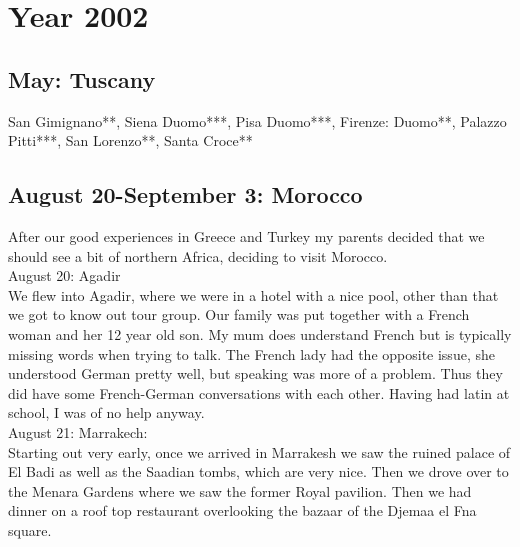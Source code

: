 \chapter{Year 2002}
\label{2002}

\section{May: Tuscany}
\label{2002:Tuscany}


San Gimignano**, Siena Duomo***, Pisa Duomo***, Firenze: Duomo**, Palazzo Pitti***, San Lorenzo**, Santa Croce**

\section{August 20-September 3: Morocco}
\label{2002:Morocco}


After our good experiences in Greece and Turkey my parents decided that we should see a bit of northern Africa, deciding to visit Morocco.\\

August 20: Agadir\\
We flew into Agadir, where we were in a hotel with a nice pool, other than that we got to know out tour group. Our family was put together with a French woman and her 12 year old son. My mum does understand French but is typically missing words when trying to talk. The French lady had the opposite issue, she understood German pretty well, but speaking was more of a problem. Thus they did have some French-German conversations with each other. Having had latin at school, I was of no help anyway.\\

August 21: Marrakech:\\
Starting out very early, once we arrived in Marrakesh we saw the ruined palace of El Badi as well as the Saadian tombs, which are very nice. Then we drove over to the Menara Gardens where we saw the former Royal pavilion. Then we had dinner on a roof top restaurant overlooking the bazaar of the Djemaa el Fna square.\\

